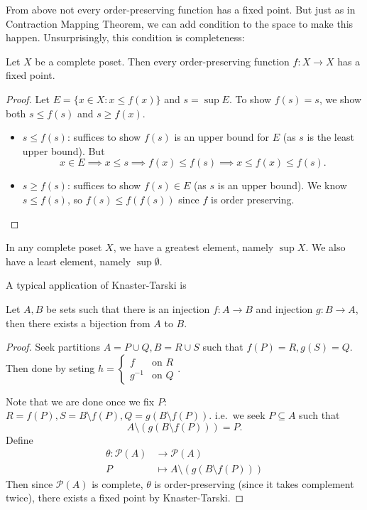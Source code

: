 \documentclass[a4paper]{article}
\begin{document}
From above not every order-preserving function has a fixed point. But just as in Contraction Mapping Theorem, we can add condition to the space to make this happen. Unsurprisingly, this condition is completeness:

\begin{theorem}
  \label{thm:Knaster-Tarski}
  Let \(X\) be a complete poset. Then every order-preserving function \(f: X \to X\) has a fixed point.
\end{theorem}

\begin{proof}
  Let \(E = \{x \in X: x \leq f(x)\}\) and \(s = \sup E\). To show \(f(s) = s\), we show both \(s \leq f(s)\) and \(s \geq f(x)\).
  \begin{itemize}
  \item \(s \leq f(s)\): suffices to show \(f(s)\) is an upper bound for \(E\) (as \(s\) is the least upper bound). But
    \[
      x \in E \implies x \leq s \implies f(x) \leq f(s) \implies x \leq f(x) \leq f(s).
    \]
  \item \(s \geq f(s)\): suffices to show \(f(s) \in E\) (as \(s\) is an upper bound). We know \(s \leq f(s)\), so \(f(s) \leq f(f(s))\) since \(f\) is order preserving.
  \end{itemize}
\end{proof}

\begin{note}
  In any complete poset \(X\), we have a greatest element, namely \(\sup X\). We also have a least element, namely \(\sup \emptyset\).
\end{note}

A typical application of Knaster-Tarski is

\begin{theorem}
  Let \(A, B\) be sets such that there is an injection \(f: A \to B\) and injection \(g: B \to A\), then there exists a bijection from \(A\) to \(B\).
\end{theorem}

\begin{proof}
  Seek partitions \(A = P \cup Q, B = R \cup S\) such that \(f(P) = R, g(S) = Q\). Then done by seting \(h = \begin{cases} f & \text{on } R \\ g^{-1} & \text{on } Q \end{cases}\).

  Note that we are done once we fix \(P\): \(R = f(P), S = B \setminus f(P), Q = g(B \setminus f(P))\). i.e.\ we seek \(P \subseteq A\) such that
  \[
    A \setminus (g(B \setminus f(P))) = P.
  \]
  Define
  \begin{align*}
    \theta: \mathcal P(A) &\to \mathcal P(A) \\
    P &\mapsto A \setminus (g(B \setminus f(P)))
  \end{align*}
  Then since \(\mathcal P(A)\) is complete, \(\theta\) is order-preserving (since it takes complement twice), there exists a fixed point by Knaster-Tarski.
\end{proof}
\end{document}
